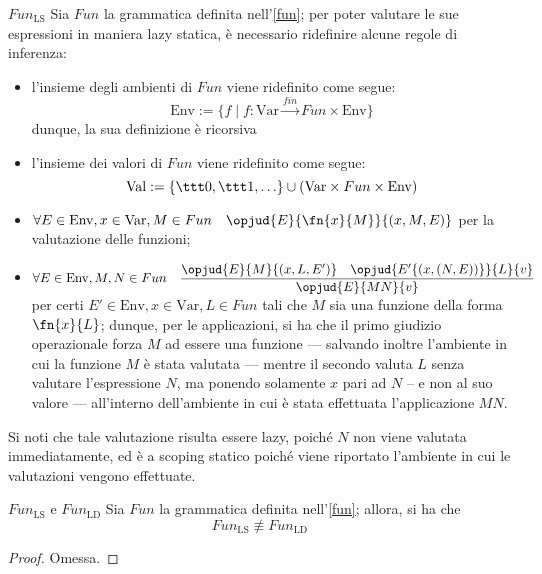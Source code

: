 \documentclass[a4paper, 12pt]{report}
\begin{document}
    \begin{framedobs}{$Fun_\mathrm{LS}$}
        Sia $Fun$ la grammatica definita nell'\cref{fun}; per poter valutare le sue espressioni in maniera lazy statica, è necessario ridefinire alcune regole di inferenza:

        \begin{itemize}
            \item l'insieme degli ambienti di $Fun$ viene ridefinito come segue: $$\mathrm{Env} := \{f \mid f :\mathrm{Var} \xrightarrow{fin} Fun \times \mathrm{Env}\}$$ dunque, la sua definizione è ricorsiva
            \item l'insieme dei valori di $Fun$ viene ridefinito come segue: $$\mathrm{Val} := \{\ttt 0, \ttt 1, \ldots\} \cup (\mathrm{Var} \times Fun \times \mathrm{Env})$$
            \item $\forall E \in \mathrm{Env}, x \in \mathrm{Var}, M \in Fun \quad \opjud{E}{\fn{x}{M}}{(x,M,E)}$ per la valutazione delle funzioni;
            \item $\forall E \in \mathrm{Env}, M,N \in Fun \quad \dfrac{\opjud{E}{M}{(x,L,E')} \quad \opjud{E'\{(x,(N,E))\}}{L}{v}}{\opjud{E}{MN}{v}}$ per certi $E' \in \mathrm{Env}, x \in \mathrm{Var}, L \in Fun$ tali che $M$ sia una funzione della forma $\fn{x}{L}$; dunque, per le applicazioni, si ha che il primo giudizio operazionale forza $M$ ad essere una funzione --- salvando inoltre l'ambiente in cui la funzione $M$ è stata valutata --- mentre il secondo valuta $L$ senza valutare l'espressione $N$, ma ponendo solamente $x$ pari ad $N$ -- e non al suo valore --- all'interno dell'ambiente in cui è stata effettuata l'applicazione $MN$.
        \end{itemize}

        Si noti che tale valutazione risulta essere lazy, poiché $N$ non viene valutata immediatamente, ed è a scoping statico poiché viene riportato l'ambiente in cui le valutazioni vengono effettuate.
    \end{framedobs}

    \begin{framedlem}[label={fun lemma pt2}]{$Fun_\mathrm{LS}$ e $Fun_\mathrm{LD}$}
        Sia $Fun$ la grammatica definita nell'\cref{fun}; allora, si ha che $$Fun_\mathrm{LS} \not\equiv Fun_\mathrm{LD}$$
    \end{framedlem}

    \begin{proof}
        Omessa.
    \end{proof}
\end{document}
